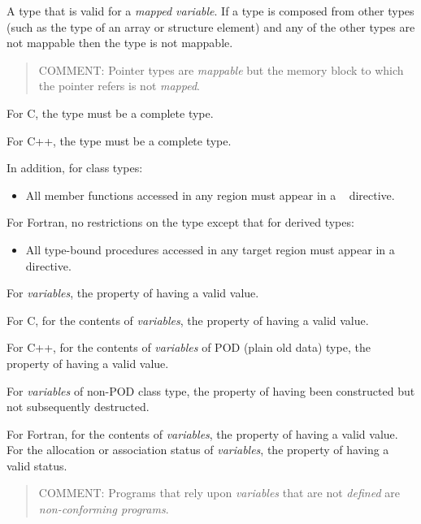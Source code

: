 \glossarydefend

\glossarydefstart
A type that is valid for a \emph{mapped variable}. If a type is composed from other types
(such as the type of an array or structure element) and any of the other types are
not mappable then the type is not mappable.

\begin{quote}
COMMENT: Pointer types are \emph{mappable} but the memory block to which the pointer refers is not \emph{mapped}.
\end{quote}

For C, the type must be a complete type.

For C++, the type must be a complete type.

In addition, for class types:
\begin{itemize}
\item All member functions accessed in any  region must appear in a
~ directive.
\end{itemize}

For Fortran, no restrictions on the type except that for derived types:

\begin{itemize}
\item All type-bound procedures accessed in any target region must appear in a ~ directive.
\end{itemize}
\glossarydefend

\glossarydefstart
For \emph{variables}, the property of having a valid value.

For C, for the contents of \emph{variables}, the property of having a valid value.

For C++, for the contents of \emph{variables} of POD (plain old data) type, the property of having
a valid value.

For \emph{variables} of non-POD class type, the property of having been constructed but
not subsequently destructed.

For Fortran, for the contents of \emph{variables}, the property of having a valid value. For the
allocation or association status of \emph{variables}, the property of having a valid status.

\begin{quote}
COMMENT: Programs that rely upon \emph{variables} that are not \emph{defined} are \emph{non-conforming programs}.
\end{quote}
\glossarydefend

